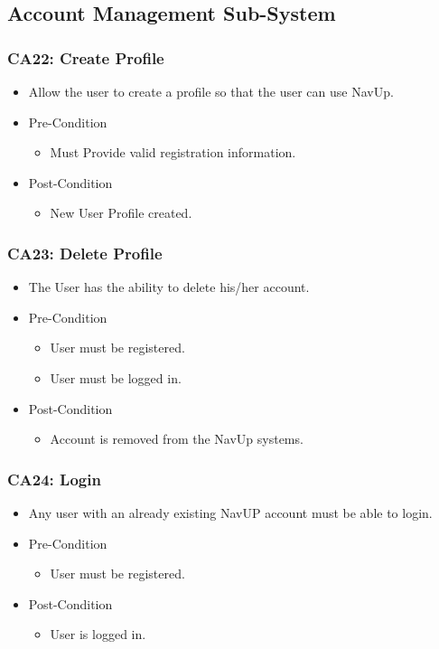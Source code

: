 \documentclass[12pt,a4paper]{article}
\begin{document}
	\subsection{Account Management Sub-System}
		\subsubsection{CA22: Create Profile}
			\begin{itemize}
				\item Allow the user to create a profile so that the user can use NavUp.
					\item Pre-Condition
						\begin{itemize}
							\item Must Provide valid registration information.
						\end{itemize}
					\item Post-Condition
						\begin{itemize}
							\item New User Profile created.
						\end{itemize}
			\end{itemize}
		\subsubsection{CA23: Delete Profile}
			\begin{itemize}
				\item The User has the ability to delete his/her account.
					\item Pre-Condition
						\begin{itemize}
							\item User must be registered.
							\item User must be logged in.
						\end{itemize}
					\item Post-Condition
						\begin{itemize}
							\item Account is removed from the NavUp systems.
						\end{itemize}
			\end{itemize}
		\subsubsection{CA24: Login}
			\begin{itemize}
				\item Any user with an already existing NavUP account must be able to login.
					\item Pre-Condition
						\begin{itemize}
							\item User must be registered.
						\end{itemize}
					\item Post-Condition
						\begin{itemize}
							\item User is logged in.
						\end{itemize}
			\end{itemize}
\end{document}
